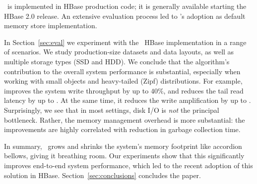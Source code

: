
\sys\ is implemented in HBase production code; it is generally available starting the HBase 2.0 release. 
An extensive evaluation process led to \sys's adoption as default memory store implementation. 

In Section~\ref{sec:eval} we experiment with the \sys\ HBase implementation in a range of scenarios.
We study production-size datasets and data layouts, as well as multiple storage types (SSD and HDD). 
We conclude that the algorithm's contribution to the overall system performance is substantial, 
especially when working with small objects and heavy-tailed (Zipf) distributions. For example, \sys\/ 
improves the system write throughput by up to $40\%$, and reduces the tail read latency by up to 
. At the same time, it reduces the write amplification by up to . Surprisingly, we see 
that in most settings, disk I/O is \emph{not} the principal bottleneck. Rather, the memory management 
overhead is more substantial: the improvements are highly correlated with  reduction in garbage collection time. 

In summary, \sys\ grows and shrinks the system's memory footprint like accordion bellows, 
giving it breathing room. Our experiments show that this significantly improves end-to-end system performance, 
which led to the recent adoption of this solution in HBase. Section~\ref{sec:conclusions} concludes the paper.

